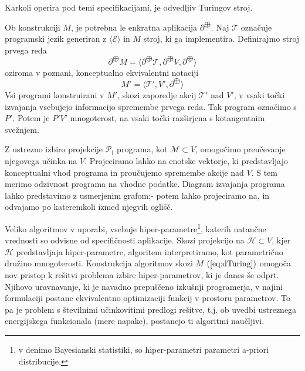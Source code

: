 \documentclass{article}
\newcommand{\II}{\mathbb{I}}
\newcommand{\E}{\mathcal{E}}
\newcommand{\T}{\mathcal{T}}
\newcommand{\Op}{\partial^{\bigoplus}}
\begin{document}
 Karkoli operira pod temi specifikacijami, je odvedljiv Turingov stroj.
 
 Ob konstrukciji $M$, je potrebna le enkratna aplikacija $\Op$. Naj $\T$ označuje programski jezik generiran z $\langle\E\rangle$ in $M$ stroj, ki ga implementira. Definirajmo stroj prvega reda
 \begin{equation}\label{eq:Mprime}
	 \Op M=\langle\Op\T, \Op V, \Op\rangle
 \end{equation}
 oziroma v poznani, konceptualno ekvivalentni notaciji
  \begin{equation}\label{eq:M'}
 	 M'=\langle\T', V', \Op\rangle
  \end{equation}
  Vsi programi konstruirani v $M'$, skozi zaporedje akcij $\T'$ nad $V'$, v vsaki točki izvajanja vsebujejo informacijo spremembe prvega reda. Tak program označimo s $P'$. Potem je $P'V'$ mnogoterost, na vsaki točki razširjena s kotangentnim svežnjem.
 
 Z ustrezno izbiro projekcije $\mathcal{P}_\II$ programa, kot $\mathcal{M}\subset V$, omogočimo preučevanje njegovega učinka na $V$. Projeciramo lahko na enotske vektorje, ki predstavljajo konceptualni vhod programa in proučujemo spremembe akcije nad $V$. S tem merimo odzivnost programa na vhodne podatke. Diagram izvajanja programa lahko predstavimo z usmerjenim grafom;- potem lahko projeciramo na, in odvajamo po kateremkoli izmed njegvih oglišč.
 
  Veliko algoritmov v uporabi, vsebuje hiper-parametre\footnote[2]{v denimo Bayesianski statistiki, so hiper-parametri parametri a-priori distribucije.}, katerih natančne vrednosti so odvisne od specifičnosti aplikacije. Skozi projekcijo na $\mathcal{H}\subset V$, kjer $\mathcal{H}$ predstavljaja hiper-parametre, algoritem interpretiramo, kot parametrično družino mnogoterosti. Konstrukcija algoritmov skozi $M$ $(\ref{eq:dTuring})$ omogoča nov pristop k rešitvi problema izbire hiper-parametrov, ki je danes še odprt. Njihovo uravnavanje, ki je navadno prepuščeno izkušnji programerja, v najini formulaciji postane ekvivalentno optimizaciji funkcij v prostoru parametrov. To pa je problem s številnimi učinkovitimi predlogi rešitve, t.j. ob uvedbi ustreznega energijskega funkcionala (mere napake), postanejo ti algoritmi naučljivi.
 
\end{document}
